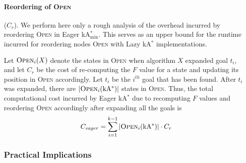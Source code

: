 \documentclass[smallextended]{svjour3}       %
\newcommand{\kastar}{kA$^*$\xspace}
\newcommand{\kastarvar}[1]{\textup{kA}$^*_{#1}$\xspace}
\newcommand{\kastarmin}{\kastarvar{\min}}
\newcommand{\open}{\textsc{Open}\xspace}
\begin{document}


\paragraph{Reordering of \open} ($C_r$).
We perform here only a rough analysis of the overhead incurred by reordering \open in Eager \kastarmin. This serves as an upper bound for the runtime incurred for reordering nodes \open with Lazy \kastar implementations. 

Let $\open_i(X)$ denote the states in \open when algorithm $X$ expanded goal $t_i$, and let $C_r$ be the cost of re-computing the $F$ value for a state and updating its position in \open accordingly. %
Let $t_i$ be the $i^{th}$ goal that has been found. 
After $t_i$ was expanded, there are $|\open_i(\text{\kastar})|$ states in \open. Thus, the total computational cost incurred by Eager \kastar due to recomputing $F$ values and reordering \open accordingly after expanding all the goals is
\begin{equation}
  C_{\mathit{eager}}=\sum_{i=1}^{k-1} |\open_i(\text{\kastar})| \cdot C_r
  \label{eq:re-sort-cost}
\end{equation}


\subsubsection{Practical Implications}
\end{document}
